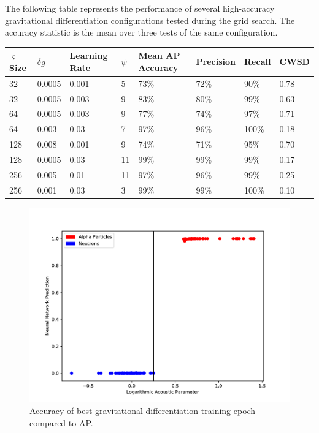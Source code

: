 \documentclass[10pt]{article}
\begin{document}
The following table represents the performance of several high-accuracy gravitational differentiation configurations tested during the grid search. The accuracy statistic is the mean over three tests of the same configuration.

\begin{minipage}{\textwidth}
    \begin{center}
        \begin{tabular}{|l|l|l|l|l|l|l|l|}
            \hline
            $\varsigma$ Size & $\delta g$ & Learning Rate & $\psi$ & Mean AP Accuracy & Precision & Recall & CWSD \\
            \hline
            32 & 0.0005 & 0.001 & 5 & 73\% & 72\% & 90\% & 0.78 \\
            \hline
            32 & 0.0005 & 0.003 & 9 & 83\% & 80\% & 99\% & 0.63 \\
            \hline
            64 & 0.0005 & 0.003 & 9 & 77\% & 74\% & 97\% & 0.71 \\
            \hline
            64 & 0.003 & 0.03 & 7 & 97\% & 96\% & 100\% & 0.18 \\
            \hline
            128 & 0.008 & 0.001 & 9 & 74\% & 71\% & 95\% & 0.70 \\
            \hline
            128 & 0.0005 & 0.03 & 11 & 99\% & 99\% & 99\% & 0.17 \\
            \hline
            256 & 0.005 & 0.01 & 11 & 97\% & 96\% & 99\% & 0.25 \\
            \hline
            256 & 0.001 & 0.03 & 3 & 99\% & 99\% & 100\% & 0.10 \\
            \hline
        \end{tabular}
    \end{center}
\end{minipage}

\begin{figure}[H]
    \centering
    \includegraphics[width=\textwidth]{grav_grid_search}
    \caption{\label{grav_grid_search} Accuracy of best gravitational differentiation training epoch compared to AP.}
\end{figure}
\end{document}
